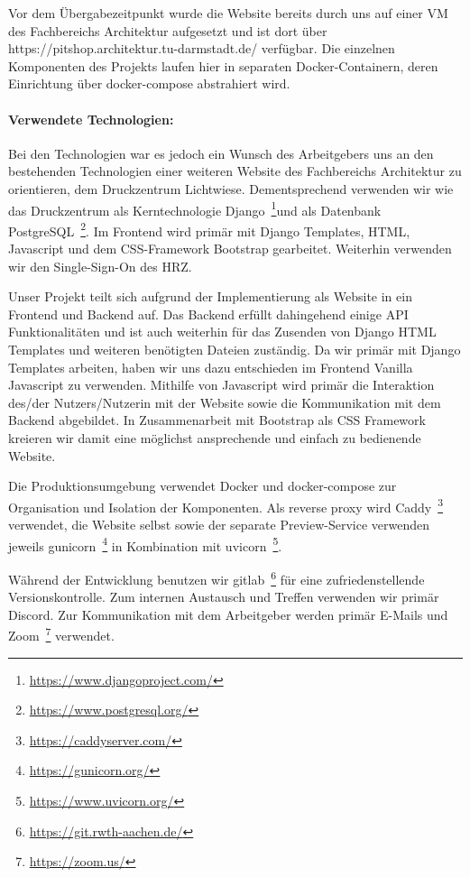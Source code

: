\documentclass[
ngerman,
accentcolor=2d,
marginpar=false,
class=report,
fontsize=11pt,
ruledheaders=section,
]{tudapub}
\begin{document}
	    Vor dem Übergabezeitpunkt wurde die Website bereits durch uns auf einer VM des Fachbereichs Architektur aufgesetzt und ist dort über https://pitshop.architektur.tu-darmstadt.de/ verfügbar. Die einzelnen Komponenten des Projekts laufen hier in separaten Docker-Containern, deren Einrichtung über docker-compose abstrahiert wird.

	    \paragraph{Verwendete Technologien:}

	    Bei den Technologien war es jedoch ein Wunsch des Arbeitgebers uns an den bestehenden Technologien einer weiteren Website des Fachbereichs Architektur zu orientieren, dem Druckzentrum Lichtwiese. Dementsprechend verwenden wir wie das Druckzentrum als Kerntechnologie Django~\footnote{\url{https://www.djangoproject.com/}}und als Datenbank PostgreSQL~\footnote{\url{https://www.postgresql.org/}}. Im Frontend wird primär mit Django Templates, HTML, Javascript und dem CSS-Framework Bootstrap gearbeitet. Weiterhin verwenden wir den Single-Sign-On des HRZ.

	    Unser Projekt teilt sich aufgrund der Implementierung als Website in ein Frontend und Backend auf. Das Backend erfüllt dahingehend einige API Funktionalitäten und ist auch weiterhin für das Zusenden von Django HTML Templates und weiteren benötigten Dateien zuständig. Da wir primär mit Django Templates arbeiten, haben wir uns dazu entschieden im Frontend Vanilla Javascript zu verwenden. Mithilfe von Javascript wird primär die Interaktion des/der Nutzers/Nutzerin mit der Website sowie die Kommunikation mit dem Backend abgebildet. In Zusammenarbeit mit Bootstrap als CSS Framework kreieren wir damit eine möglichst ansprechende und einfach zu bedienende Website.

	    Die Produktionsumgebung verwendet Docker und docker-compose zur Organisation und Isolation der Komponenten. Als reverse proxy wird Caddy~\footnote{\url{https://caddyserver.com/}} verwendet, die Website selbst sowie der separate Preview-Service verwenden jeweils gunicorn~\footnote{\url{https://gunicorn.org/}} in Kombination mit uvicorn~\footnote{\url{https://www.uvicorn.org/}}.

	    Während der Entwicklung benutzen wir gitlab~\footnote{\url{https://git.rwth-aachen.de/}} für eine zufriedenstellende Versionskontrolle. Zum internen Austausch und Treffen verwenden wir primär Discord. Zur Kommunikation mit dem Arbeitgeber werden primär E-Mails und Zoom~\footnote{\url{https://zoom.us/}} verwendet.
\end{document}

